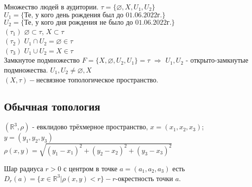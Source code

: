 \begin{example}
Множество людей в аудитории. $\tau=\{\varnothing,X,U_1,U_2\}$\\
$U_1=\{\text{Те, у кого день рождения был до 01.06.2022г.}\}$\\
$U_2=\{\text{Те, у кого дня рождения не было до 01.06.2022г.}\}$\\
$(\tau_1)$ $\varnothing{\subset}\tau$, $X{\subset}\tau$\\
$(\tau_2)$ $U_1{\cap}U_2=\varnothing{\in}\tau$\\
$(\tau_3)$ $U_1{\cup}U_2=X{\in}\tau$\\
Замкнутое подмножество $F=\{X,\varnothing,U_2,U_1\}=\tau$ $\Rightarrow$ $U_1,U_2$ - открыто-замкнутые подмножества. $U_1,U_2{\neq}\varnothing,X$\\
$(X,\tau)-$несвязное топологическое пространство.
\end{example}

\subsection{Обычная топология}
$(\mathbb{R}^3,\rho)$ - евклидово трёхмерное пространство, $x=(x_1,x_2,x_3)$; $y=(y_1,y_2,y_3)$\\
$\rho(x,y)=\sqrt{(y_1-x_1)^2+(y_2-x_2)^2+(y_3-x_3)^2}$

\begin{definition}[Шар]
Шар радиуса $r>0$ с центром в точке $a=(a_1,a_2,a_3)$ есть $D_r(a)=\{x{\in}\mathbb{R}^3|\rho(x,y)<r\}-r$-окрестность точки $a$.
\end{definition}

